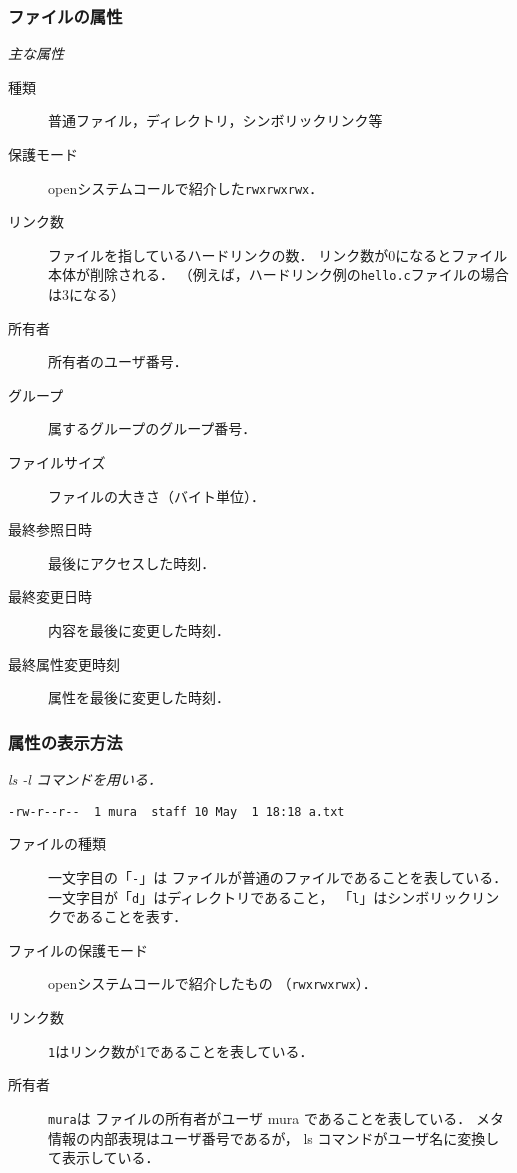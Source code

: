 \documentclass{beamer}                 %
\begin{document}
\begin{frame}[fragile]
  \frametitle{ファイルの属性}
  \emph{主な属性}
  \begin{description}
  \item[種類] 普通ファイル，ディレクトリ，シンボリックリンク等
  \item[保護モード] openシステムコールで紹介した\texttt{rwxrwxrwx}．
  \item[リンク数] ファイルを指しているハードリンクの数．
    リンク数が0になるとファイル本体が削除される．
    （例えば，ハードリンク例の\texttt{hello.c}ファイルの場合は3になる）
  \item[所有者] 所有者のユーザ番号．
  \item[グループ] 属するグループのグループ番号．
  \item[ファイルサイズ] ファイルの大きさ（バイト単位）．
  \item[最終参照日時] 最後にアクセスした時刻．
  \item[最終変更日時] 内容を最後に変更した時刻．
  \item[最終属性変更時刻] 属性を最後に変更した時刻．
  \end{description}
\end{frame}

\begin{frame}[fragile]
  \frametitle{属性の表示方法}
  \emph{ls -l コマンドを用いる．}
  \begin{lstlisting}[numbers=none]
% ls -l a.txt
-rw-r--r--  1 mura  staff 10 May  1 18:18 a.txt
  \end{lstlisting}
\begin{description}
\item[ファイルの種類] 一文字目の「\texttt{-}」は
ファイルが普通のファイルであることを表している．
一文字目が「\texttt{d}」はディレクトリであること，
「\texttt{l}」はシンボリックリンクであることを表す．
\item[ファイルの保護モード] openシステムコールで紹介したもの
（\texttt{rwxrwxrwx}）．
\item[リンク数] \texttt{1}はリンク数が1であることを表している．
\item[所有者] \texttt{mura}は
ファイルの所有者がユーザ mura であることを表している．
メタ情報の内部表現はユーザ番号であるが，
ls コマンドがユーザ名に変換して表示している．
\end{description}
\end{frame}
\end{document}
